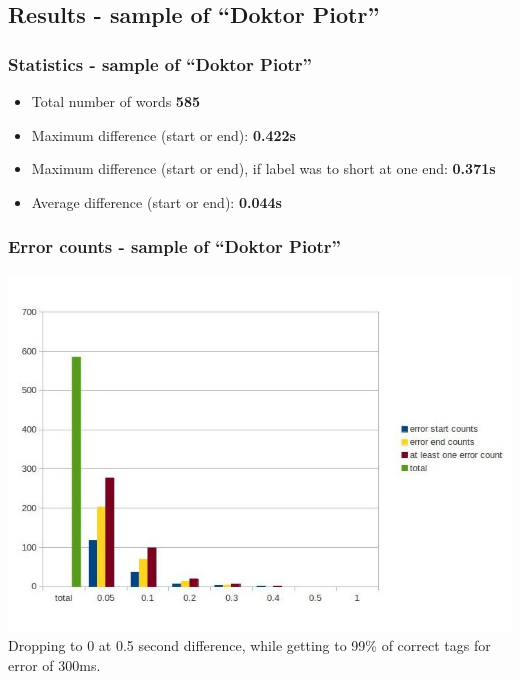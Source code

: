 \documentclass[]{beamer}
\begin{document}
\subsection{Results - sample of “Doktor Piotr”}
\begin{frame}
    \frametitle{Statistics - sample of “Doktor Piotr”}
    \begin{itemize}
        \item Total number of words				\textbf{585}
        \item Maximum difference (start or end): 			\textbf{0.422s}
        \item Maximum difference (start or end), if label was to short at one end: 			\textbf{0.371s}
        \item Average difference  (start or end):			\textbf{0.044s}
    \end{itemize}
\end{frame}
\begin{frame}
    \frametitle{Error counts - sample of “Doktor Piotr”}
    \includegraphics[scale=0.37]{doktor_piotr_length_based_counts.jpg}
    Dropping to 0 at 0.5 second difference, while getting to 99\% of correct tags for error of 300ms.
\end{frame}
\end{document}
